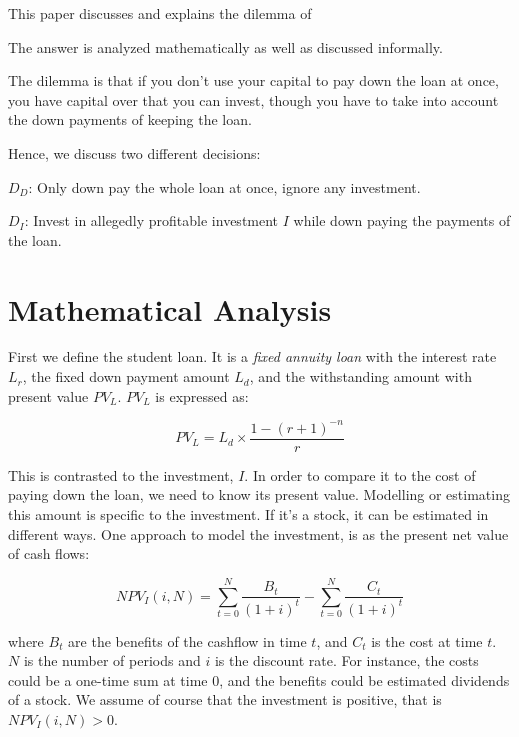 \documentclass[a4paper]{article}
\title{\documenttitle}
\date{\today}
\author{Frans Englich \\
\href{mailto:fenglich@fastmail.fm}{fenglich@fastmail.fm}}
\begin{document}
\maketitle

This paper discusses and explains the dilemma of 

The answer is analyzed mathematically as well as discussed
informally.

The dilemma is that if you don't use your capital to pay down the loan at once,
you have capital over that you can invest, though you have to take into account
the down payments of keeping the loan.

Hence, we discuss two different decisions:

$D_D$: Only down pay the whole loan at once, ignore any investment.

$D_I$: Invest in allegedly profitable investment $I$ while down paying the
payments of the loan.

\section{Mathematical Analysis}

First we define the student loan. It is a \emph{fixed annuity loan} with the
interest rate $L_r$, the fixed down payment amount $L_d$, and the withstanding
amount with present value $PV_L$. $PV_L$ is expressed as:

\def\PV_L{L_d \times \frac{1 - (r + 1)^{-n}}{r}}
\begin{equation}
PV_L=\PV_L
\end{equation}

This is contrasted to the investment, $I$. In order to compare it to the cost of
paying down the loan, we need to know its present value. Modelling or estimating
this amount is specific to the investment. If it's a stock, it can be estimated
in different ways. One approach to model the investment, is as the present net
value of cash flows:

\def\NPV_I{\sum_{t=0}^{N} \frac{B_t}{(1 + i)^t} - \sum_{t=0}^{N} \frac{C_t}{(1 + i)^t}}
\begin{equation}
NPV_I(i, N)= \NPV_I
\end{equation}

where $B_t$ are the benefits of the cashflow in time $t$, and $C_t$ is the cost
at time $t$. $N$ is the number of periods and $i$ is the discount rate. For
instance, the costs could be a one-time sum at time $0$, and the benefits could
be estimated dividends of a stock. We assume of course that the investment is
positive, that is $NPV_I(i, N) > 0$.
\end{document}

